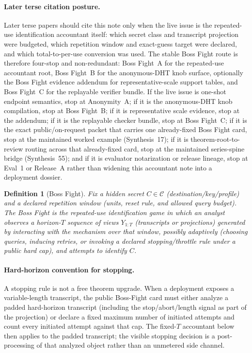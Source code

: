 \documentclass[11pt]{article}
\newcommand{\C}{\mathcal{C}} %
\newtheorem{definition}{Definition}
\begin{document}
\paragraph{Later terse citation posture.}
Later terse papers should cite this note only when the live issue is the repeated-use identification accountant itself: which secret class and transcript projection were budgeted, which repetition window and exact-guess target were declared, and which total-to-per-use conversion was used.
The stable Boss Fight route is therefore four-stop and non-redundant: Boss Fight~A for the repeated-use accountant root, Boss Fight~B for the anonymous-DHT knob surface, optionally the Boss Fight evidence addendum for representative-scale support tables, and Boss Fight~C for the replayable verifier bundle.
If the live issue is one-shot endpoint semantics, stop at Anonymity~A; if it is the anonymous-DHT knob compilation, stop at Boss Fight~B; if it is representative scale evidence, stop at the addendum; if it is the replayable checker bundle, stop at Boss Fight~C; if it is the exact public/on-request packet that carries one already-fixed Boss Fight card, stop at the maintained worked example (Synthesis~17); if it is theorem-root-to-review routing across that already-fixed card, stop at the maintained series-spine bridge (Synthesis~55); and if it is evaluator notarization or release lineage, stop at Eval~1 or Release~A rather than widening this accountant note into a deployment dossier.\cite{series:oddsinflation,series:bossfightB,series:bossfightBaddendum,series:bossfightC,series:workedexample,series:seriesspines,series:evalnotary,series:releaseproperty}

\begin{definition}[Boss Fight]\label{def:bossfight}
Fix a hidden secret $C\in\C$ (destination/key/profile) and a declared repetition window (units, reset rule, and allowed query budget).
The \emph{Boss Fight} is the repeated-use identification game in which an analyst observes a horizon-$T$ sequence of views $Y_{1:T}$ (transcripts or projections) generated by interacting with the mechanism over that window, possibly adaptively (choosing queries, inducing retries, or invoking a declared stopping/throttle rule under a public hard cap), and attempts to identify $C$.
\end{definition}

\paragraph{Hard-horizon convention for stopping.}
A stopping rule is not a free theorem upgrade.
When a deployment exposes a variable-length transcript, the public Boss-Fight card must either analyze a padded hard-horizon transcript (including the stop/abort/length signal as part of the projection) or declare a fixed maximum number of initiated attempts and count every initiated attempt against that cap.
The fixed-$T$ accountant below then applies to the padded transcript; the visible stopping decision is a post-processing of that analyzed object rather than an unmetered side channel.
\end{document}
